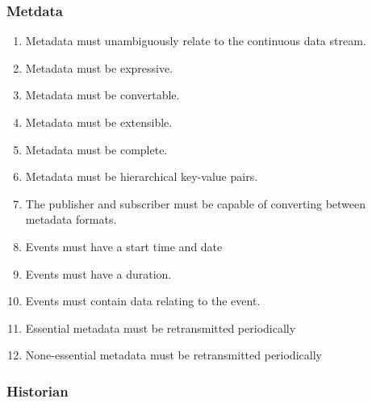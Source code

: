 \subsubsection{Metdata}

\begin{enumerate}
	\item Metadata must unambiguously relate to the continuous data stream.
	\item Metadata must be expressive.
	\item Metadata must be convertable.
	\item Metadata must be extensible.
	\item Metadata must be complete.
	\item Metadata must be hierarchical key-value pairs.
	\item The publisher and subscriber must be capable of converting between metadata formats.
	\item Events must have a start time and date
	\item Events must have a duration.
	\item Events must contain data relating to the event.
	\item Essential metadata must be retransmitted periodically
	\item None-essential metadata must be retransmitted periodically
\end{enumerate}

\subsubsection{Historian}
